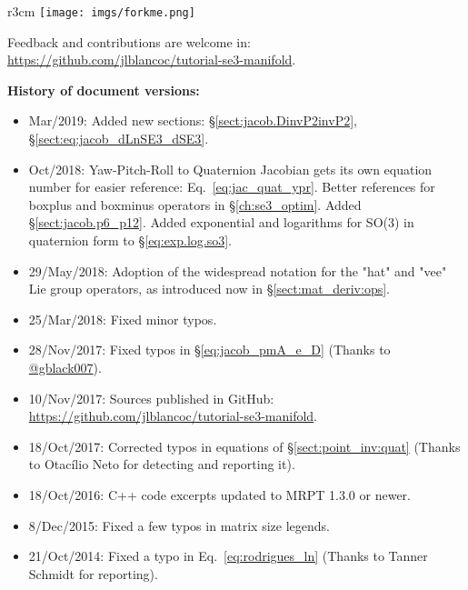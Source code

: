\documentclass[a4paper,11pt]{report}
\begin{document}
\newpage

\begin{wrapfigure}{r}{3cm}
    \texttt{[image: imgs/forkme.png]}
\end{wrapfigure}

Feedback and contributions are welcome in: \\
\url{https://github.com/jlblancoc/tutorial-se3-manifold}.

\vspace{2cm}

\textbf{History of document versions:}
\begin{itemize}
 \item Mar/2019: Added new sections: \S\ref{sect:jacob.DinvP2invP2}, \S\ref{sect:eq:jacob_dLnSE3_dSE3}.

 \item Oct/2018: Yaw-Pitch-Roll to Quaternion Jacobian gets its own equation number for easier reference: Eq.~\ref{eq:jac_quat_ypr}. Better references for boxplus and boxminus operators in \S\ref{ch:se3_optim}. Added \S\ref{sect:jacob.p6_p12}. Added exponential and logarithms for SO(3) in quaternion form to \S\ref{eq:exp.log.so3}.
	
 \item 29/May/2018: Adoption of the widespread notation for the "hat" and "vee" Lie group operators, as introduced now in \S\ref{sect:mat_deriv:ops}.

 \item 25/Mar/2018: Fixed minor typos.
  
 \item 28/Nov/2017: Fixed typos in \S\ref{eq:jacob_pmA_e_D} (Thanks to \href{https://github.com/gblack007}{@gblack007}).

 \item 10/Nov/2017: Sources published in GitHub: \\
    \url{https://github.com/jlblancoc/tutorial-se3-manifold}.

 \item 18/Oct/2017: Corrected typos in equations of \S\ref{sect:point_inv:quat} (Thanks to Otacílio Neto for detecting and reporting it).

 \item 18/Oct/2016: C++ code excerpts updated to MRPT 1.3.0 or newer.

 \item 8/Dec/2015: Fixed a few typos in matrix size legends.

 \item 21/Oct/2014: Fixed a typo in Eq.~\ref{eq:rodrigues_ln} (Thanks to Tanner Schmidt for reporting).


\end{itemize}
\end{document}
